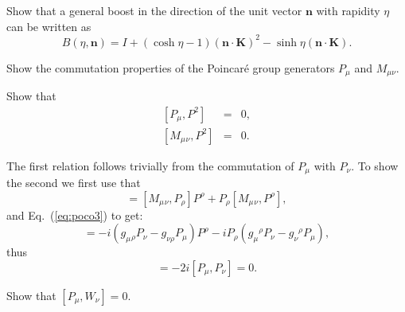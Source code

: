 \documentclass[notes.tex]{subfiles}
\begin{document}
\begin{Exercise}[]
Show that a general boost in the direction of the unit vector $\mathbf n$ with rapidity $\eta$ can be written as
\begin{equation*}
B(\eta,\mathbf n)=I+(\cosh\eta-1)(\mathbf n \cdot \mathbf K)^2-\sinh\eta (\mathbf n \cdot \mathbf K).
\end{equation*}
\end{Exercise}


\begin{Exercise}[]
Show the commutation properties of the Poincaré group generators $P_\mu$ and $M_{\mu\nu}$.
\end{Exercise}

\begin{Exercise}[]
Show that
\begin{eqnarray*}
\left[P_\mu, P^2\right] &=& 0,\\
\left[M_\mu{}_{\nu}, P^2\right]& =& 0.
\end{eqnarray*}
\end{Exercise}

\begin{Answer} 
The first relation follows trivially from the commutation of $P_\mu$ with $P_\nu$. To show the second
we first use that
\begin{equation*}
[M_\mu{}_\nu, P_\rho P^\rho] = [M_\mu{}_\nu, P_\rho] P^\rho  + P_\rho [M_\mu{}_\nu,  P^\rho],
\end{equation*}
and Eq.~(\ref{eq:poco3}) to get:
\begin{equation*}
[M_\mu{}_\nu, P_\rho P^\rho] = -i(g_\mu{}_\rho P_\nu - g_{\nu \rho} P_\mu) P^\rho  - iP_\rho (g_\mu{}^\rho P_\nu - g_{\nu}{}^{ \rho} P_\mu),
\end{equation*}
thus
\begin{equation*}
[M_\mu{}_\nu, P_\rho P^\rho] = -2i[P_\mu, P_\nu] = 0.
\end{equation*}
\end{Answer}

\begin{Exercise}[]
Show that $[P_\mu,W_\nu]=0$.
\end{Exercise}
\end{document}
